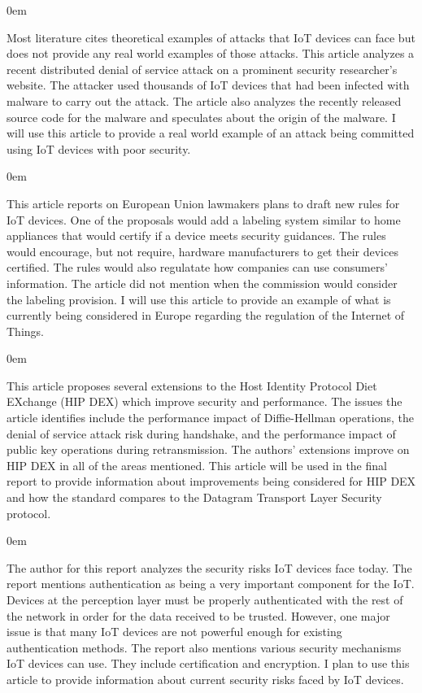 \documentclass{article}
\newenvironment{annotation}{\begin{addmargin}[2.5em]{0em} \begin{flushleft}}{\end{flushleft} \end{addmargin}}
\begin{document}
\begin{annotation}
Most literature cites theoretical examples of attacks that IoT devices can face but does not provide any real world examples of those attacks. This article analyzes a recent distributed denial of 
service attack on a prominent security researcher's website. The attacker used thousands of IoT devices that had been infected with malware to carry out the attack. The article also analyzes the
recently released source code for the malware and speculates about the origin of the malware. I will use this article to provide a real world example of an attack being committed using IoT devices with poor security. 
\end{annotation}

\begin{annotation}
This article reports on European Union lawmakers plans to draft new rules for IoT devices. One of the proposals would add a labeling system similar to home appliances that would
certify if a device meets security guidances. The rules would encourage, but not require, hardware manufacturers to get their devices certified. The rules would also regulatate how companies 
can use consumers' information. The article did not mention when the commission would consider the labeling provision. I will use this article to provide an example of what is currently being considered in Europe regarding the regulation of the Internet of Things. 
\end{annotation}

\begin{annotation}
This article proposes several extensions to the Host Identity Protocol Diet EXchange (HIP DEX) which improve security and performance. The issues the article identifies include the performance impact of 
Diffie-Hellman operations, the denial of service attack risk during handshake, and the performance impact of public key operations during retransmission. The authors' extensions improve on HIP DEX in all of
the areas mentioned. This article will be used in the final report to provide information about improvements being considered for HIP DEX and how the standard compares to the Datagram Transport Layer Security protocol. 
\end{annotation}

\newpage
{}
\begin{annotation}
The author for this report analyzes the security risks IoT devices face today. The report mentions authentication as being a very important component for the IoT. Devices at the perception layer must be
properly authenticated with the rest of the network in order for the data received to be trusted. However, one major issue is that many IoT devices are not powerful enough for existing authentication methods.
The report also mentions various security mechanisms IoT devices can use. They include certification and encryption. I plan to use this article to provide information about current security risks
faced by IoT devices.
\end{annotation}
\end{document}
